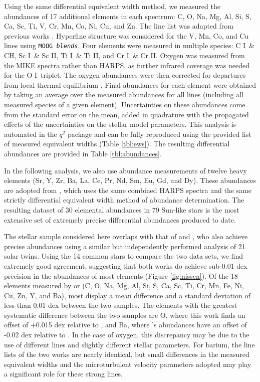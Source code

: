 \documentclass[twocolumn]{aastex62}
\newcommand{\I}{\textsc{I}}
\newcommand{\II}{\textsc{II}}
\newcommand{\acronym}[1]{{\small{#1}}}
\begin{document}
Using the same differential equivalent width method, we measured the abundances of 17 additional elements in each spectrum: C, O, Na, Mg, Al, Si, S, Ca, Sc, Ti, V, Cr, Mn, Co, Ni, Cu, and Zn. The line list was adapted from previous works \citep{bedell14, ramirez14}. Hyperfine structure was considered for the V, Mn, Co, and Cu lines using \texttt{MOOG \textit{blends}}. Four elements were measured in multiple species: C \I\ \& CH, Sc \I\ \& Sc \II,  Ti \I\ \& Ti \II, and Cr \I\ \& Cr \II. Oxygen was measured from the \acronym{MIKE} spectra rather than \acronym{HARPS}, as further infrared coverage was needed for the O \I\ triplet. The oxygen abundances were then corrected for departures from local thermal equilibrium \citep{ramirez13}. 
Final abundances for each element were obtained by taking an average over the measured abundances for all lines (including all measured species of a given element). Uncertainties on these abundances come from the standard error on the mean, added in quadrature with the propagated effects of the uncertainties on the stellar model parameters. This analysis is automated in the $q^2$ package and can be fully reproduced using the provided list of measured equivalent widths (Table \ref{tbl:ews}). The resulting differential abundances are provided in Table \ref{tbl:abundances}.

In the following analysis, we also use abundance measurements of twelve heavy elements (Sr, Y, Zr, Ba, La, Ce, Pr, Nd, Sm, Eu, Gd, and Dy). These abundances are adopted from \citet{spina17}, which uses the same combined \acronym{HARPS} spectra and the same strictly differential equivalent width method of abundance determination. The resulting dataset of 30 elemental abundances in 79 Sun-like stars is the most extensive set of extremely precise differential abundances produced to date. %

The stellar sample considered here overlaps with that of \citet{nissen15} and \citet{nissen16}, who also achieve precise abundances using a similar but independently performed analysis of 21 solar twins. Using the 14 common stars to compare the two data sets, we find extremely good agreement, suggesting that both works do achieve sub-0.01 dex precision in the abundances of most elements (Figure \ref{fig:nissen}). Of the 18 elements measured by \citet{nissen15} or \citet{nissen16} (C, O, Na, Mg, Al, Si, S, Ca, Sc, Ti, Cr, Mn, Fe, Ni, Cu, Zn, Y, and Ba), most display a mean difference and a standard deviation of less than 0.01 dex between the two samples. The elements with the greatest systematic difference between the two samples are O, where this work finds an offset of +0.015 dex relative to \citet{nissen15}, and Ba, where \citet{spina17}'s abundances have an offset of -0.02 dex relative to \citet{nissen16}. In the case of oxygen, this discrepancy may be due to the use of different lines and slightly different stellar parameters. For barium, the line lists of the two works are nearly identical, but small differences in the measured equivalent widths and the microturbulent velocity parameters adopted may play a significant role for these strong lines.
\end{document}
